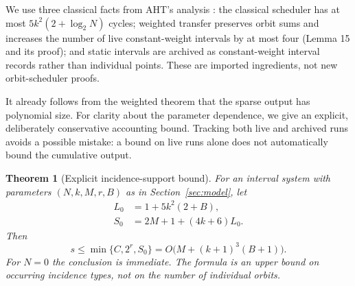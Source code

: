 \documentclass[11pt]{article}
\newtheorem{theorem}{Theorem}[section]
\theoremstyle{definition}
\begin{document}
We use three classical facts from AHT's analysis \cite{aht}: the classical
scheduler has at most $5k^2(2+\log_2N)$ cycles; weighted transfer preserves
orbit sums and increases the number of live constant-weight intervals by
at most four (Lemma 15 and its proof); and static intervals are archived
as constant-weight interval records rather than individual points.
These are imported ingredients, not new orbit-scheduler proofs.

It already follows from the weighted theorem that the sparse output has
polynomial size. For clarity about the parameter dependence, we give an
explicit, deliberately conservative accounting bound. Tracking both live
and archived runs avoids a possible mistake: a bound on live runs alone
does not automatically bound the cumulative output.

\begin{theorem}[Explicit incidence-support bound]
\label{thm:support}
For an interval system with parameters $(N,k,M,r,B)$ as in
Section~\ref{sec:model}, let
\begin{align}
 L_0&=1+5k^2(2+B),\label{eq:lzero}\\
 S_0&=2M+1+(4k+6)L_0.\label{eq:szero}
\end{align}
Then
\begin{equation}
 s\leq\min\{C,2^r,S_0\}
   =O\bigl(M+(k+1)^3(B+1)\bigr).
 \label{eq:supportbound}
\end{equation}
For $N=0$ the conclusion is immediate. The formula is an upper bound on
occurring incidence types, not on the number of individual orbits.
\end{theorem}
\end{document}
